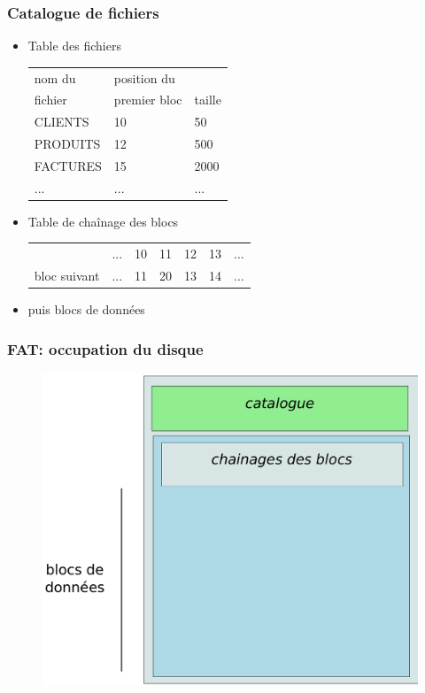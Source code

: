 \begin{frame}
  \frametitle{Catalogue de fichiers}
  \begin{itemize}
  \item Table des fichiers
    \begin{center}
      \begin{tabular}{|lll|}
        \hline
        \alert{nom} du     & position du & \\
        fichier & \alert{premier bloc} & \alert{taille} \\
        \hline
        CLIENTS & 10 & 50 \\ PRODUITS & 12 & 500 \\ FACTURES & 15 & 2000 \\ ... & ... &
        ... \\
        \hline
      \end{tabular}
    \end{center}
    
  \item \alert{Table de chaînage} des blocs 
    \begin{center}
      \begin{tabular}{|c|c|c|c|c|c|c|}
        \multicolumn{1}{c}{} & \multicolumn{1}{c}{...} & \multicolumn{1}{c}{10} &
        \multicolumn{1}{c}{11} & \multicolumn{1}{c}{12} & \multicolumn{1}{c}{13} &
        \multicolumn{1}{c}{...}\\
        \cline{1-7}
        \small{\alert{bloc suivant}} & ... & 11 & 20 & 13 & 14 & ... \\
        \cline{1-7}%
\end{tabular}
\end{center}
\item puis blocs de données
\end{itemize}
\end{frame}

\begin{frame}
  \frametitle{FAT: occupation du disque}
  \begin{figure}
    \includegraphics[width=0.8\linewidth]{fig4/fat}
  \end{figure}
\end{frame}

